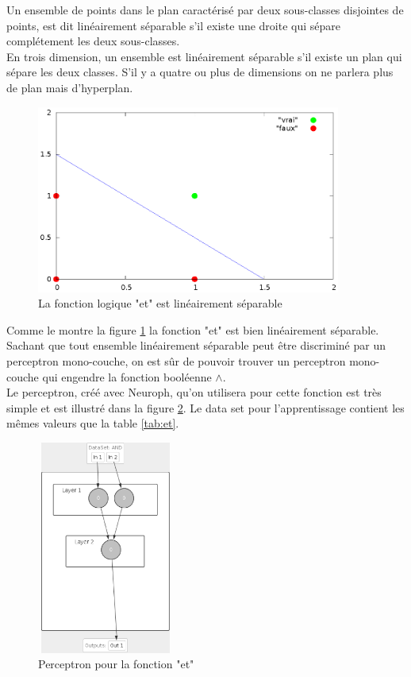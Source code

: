 \documentclass[twoside,openright,a4paper,11pt,french]{article}
\begin{document}
Un ensemble de points dans le plan caractérisé par deux sous-classes disjointes
de points, est dit linéairement séparable s'il existe une droite qui sépare
complétement les deux sous-classes.\\

En trois dimension, un ensemble est linéairement séparable s'il existe un plan
qui sépare les deux classes. S'il y a quatre ou plus de  dimensions on ne parlera plus de
plan mais d'hyperplan.


\begin{figure}[ht]
\centering
\includegraphics[width=10cm]{./pics/and/and.eps}
\caption{La fonction logique "et" est linéairement séparable}
\label{fig:and}
\end{figure}


Comme le montre la figure \ref{fig:and} la fonction "et" est bien linéairement
séparable. Sachant que tout ensemble linéairement séparable peut être
discriminé par un perceptron mono-couche, on est sûr de pouvoir trouver un perceptron mono-couche qui
engendre la fonction booléenne $\land$.\\

Le perceptron, créé avec Neuroph, qu'on utilisera pour cette fonction 
est très simple et est illustré dans la figure \ref{fig:per_and}.
Le data set pour l'apprentissage contient les mêmes valeurs que la table
\ref{tab:et}.

\begin{figure}[ht]
\centering
\includegraphics[width=4.5cm,height=7cm]{./pics/perc_and.eps}
\caption{Perceptron pour la fonction "et"}
\label{fig:per_and}
\end{figure}
\end{document}
